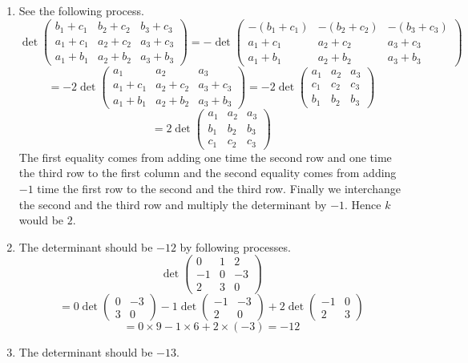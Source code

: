 \begin{enumerate}
\item See the following process.
\[\det\begin{pmatrix}b_1+c_1&b_2+c_2&b_3+c_3\\a_1+c_1&a_2+c_2&a_3+c_3\\a_1+b_1&a_2+b_2&a_3+b_3\end{pmatrix}=-\det\begin{pmatrix}-(b_1+c_1)&-(b_2+c_2)&-(b_3+c_3)\\a_1+c_1&a_2+c_2&a_3+c_3\\a_1+b_1&a_2+b_2&a_3+b_3\end{pmatrix}\]
\[=-2\det\begin{pmatrix}a_1&a_2&a_3\\a_1+c_1&a_2+c_2&a_3+c_3\\a_1+b_1&a_2+b_2&a_3+b_3\end{pmatrix}=-2\det\begin{pmatrix}a_1&a_2&a_3\\c_1&c_2&c_3\\b_1&b_2&b_3\end{pmatrix}\]
\[=2\det\begin{pmatrix}a_1&a_2&a_3\\b_1&b_2&b_3\\c_1&c_2&c_3\end{pmatrix}\]
The first equality comes from adding one time the second row and one time the third row to the first column and the second equality comes from adding $-1$ time the first row to the second and the third row. Finally we interchange the second and the third row and multiply the determinant by $-1$. Hence $k$ would be $2$.
\item The determinant should be $-12$ by following processes.
\[\det\begin{pmatrix}0&1&2\\-1&0&-3\\2&3&0\end{pmatrix}\]
\[=0\det\begin{pmatrix}0&-3\\3&0\end{pmatrix}-1\det\begin{pmatrix}-1&-3\\2&0\end{pmatrix}+2\det\begin{pmatrix}-1&0\\2&3\end{pmatrix}\]
\[=0\times 9-1\times 6+2\times (-3)=-12\]
\item The determinant should be $-13$.

\end{enumerate}
